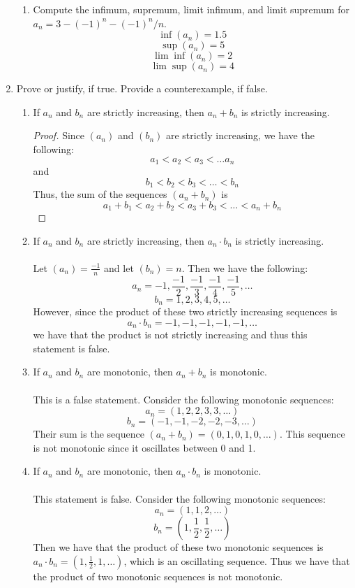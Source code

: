 \documentclass[12pt,letterpaper]{article}
\theoremstyle{case}
\theoremstyle{definition}
\begin{document}
\begin{enumerate}
\begin{enumerate}
		\item Compute the infimum, supremum, limit infimum, and limit supremum for $a_n = 3 - (-1)^n - (-1)^n/n$. 
		\[\inf (a_n)=1.5\]
		\[\sup (a_n)=5\]
		\[\lim \inf (a_n)=2\]
		\[\lim \sup (a_n)=4\]
	\end{enumerate}

	\item Prove or justify, if true. Provide a counterexample, if false.
	\begin{enumerate}
		\item If $a_n$ and $b_n$ are strictly increasing, then $a_n + b_n$ is strictly increasing.
		\begin{proof}
			Since $(a_n)$ and $(b_n)$ are strictly increasing, we have the following:
			\[a_1<a_2<a_3<\dots a_n\]
			and
			\[b_1<b_2<b_3<\dots <b_n\]
			Thus, the sum of the sequences $(a_n+b_n)$ is
			\[a_1+b_1<a_2+b_2<a_3+b_3< \dots < a_n+b_n\]
		\end{proof}
		
		\item If $a_n$ and $b_n$ are strictly increasing, then $a_n \cdot b_n$ is strictly increasing.
		\\\\Let $(a_n)=\frac{-1}{n}$ and let $(b_n)=n$. Then we have the following:
		\[a_n=-1,\frac{-1}{2},\frac{-1}{3},\frac{-1}{4}, \frac{-1}{5}, \dots \]
		\[b_n=1,2,3,4,5,\dots \]
		However, since the product of these two strictly increasing sequences is 
		\[a_n \cdot b_n = -1,-1,-1,-1,-1, \dots \]
		we have that the product is not strictly increasing and thus this statement is false.
		
		\item If $a_n$ and $b_n$ are monotonic, then $a_n + b_n$ is monotonic.
		\\\\This is a false statement. Consider the following monotonic sequences:
		\[a_n=(1,2,2,3,3,\dots)\]
		\[b_n=(-1,-1,-2,-2,-3, \dots)\]
		Their sum is the sequence $(a_n+b_n)=(0,1,0,1,0,\dots)$. This sequence is not monotonic since it oscillates between 0 and 1. 
		
		\item If $a_n$ and $b_n$ are monotonic, then $a_n \cdot b_n$ is monotonic.
		\\\\This statement is false. Consider the following monotonic sequences:
		\[a_n=(1,1,2, \dots)\]
		\[b_n=(1, \frac{1}{2}, \frac{1}{2}, \dots)\]
		Then we have that the product of these two monotonic sequences is $a_n \cdot b_n=(1,\frac{1}{2},1,\dots)$, which is an oscillating sequence. Thus we have that the product of two monotonic sequences is not monotonic.
		

\end{enumerate}
\end{enumerate}
\end{document}
